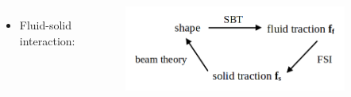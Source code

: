 \documentclass{beamer}
\newcommand{\bi}{\begin{itemize}}
\newcommand{\ei}{\end{itemize}}
\begin{document}
\begin{frame}
\begin{overlayarea}{\textwidth}{\textheight}
\vspace{0.2cm}
		\begin{columns}
				\vspace{-0.6cm} 
			\bi
			\item Fluid-solid interaction: 
			\ei
			 \vspace{-0.35cm}
			\begin{figure}[htb]
				\begin{center}
					\includegraphics[width=0.9\textwidth]{plots/logic.png}
				\end{center}
			\end{figure}
		\end{columns}\vspace{0.1cm}
	\end{overlayarea}
\end{frame}

\end{document}

